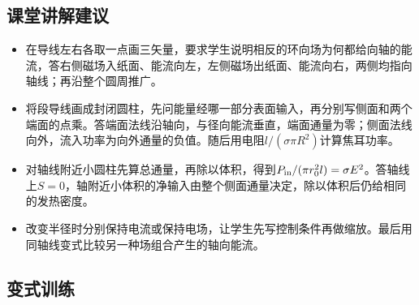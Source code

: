\documentclass[UTF8,fontset=fandol,a4paper,11pt]{ctexart}
\begin{document}


\subsection*{课堂讲解建议}

\begin{itemize}
\item 在导线左右各取一点画三矢量，要求学生说明相反的环向场为何都给向轴的能流，答右侧磁场入纸面、能流向左，左侧磁场出纸面、能流向右，两侧均指向轴线；再沿整个圆周推广。
\item 将段导线画成封闭圆柱，先问能量经哪一部分表面输入，再分别写侧面和两个端面的点乘。答端面法线沿轴向，与径向能流垂直，端面通量为零；侧面法线向外，流入功率为向外通量的负值。随后用电阻$l/(\sigma\pi R^2)$计算焦耳功率。
\item 对轴线附近小圆柱先算总通量，再除以体积，得到$P_{\rm in}/(\pi r_0^2l)=\sigma E^2$。答轴线上$S=0$，轴附近小体积的净输入由整个侧面通量决定，除以体积后仍给相同的发热密度。
\item 改变半径时分别保持电流或保持电场，让学生先写控制条件再做缩放。最后用同轴线变式比较另一种场组合产生的轴向能流。
\end{itemize}



\subsection*{变式训练}
\end{document}
